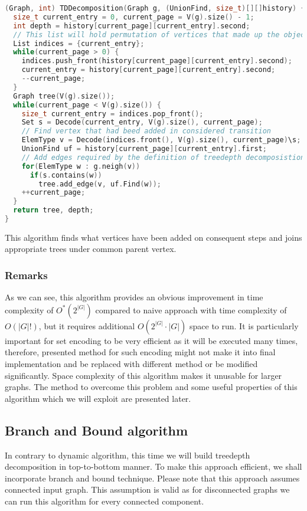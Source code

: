 \begin{lstlisting}[language=C++]
(Graph, int) TDDecomposition(Graph g, (UnionFind, size_t)[][]history) {
  size_t current_entry = 0, current_page = V(g).size() - 1;
  int depth = history[current_page][current_entry].second;
  // This list will hold permutation of vertices that made up the object in history[current_page][current_entry]
  List indices = {current_entry};
  while(current_page > 0) {
    indices.push_front(history[current_page][current_entry].second);
    current_entry = history[current_page][current_entry].second;
    --current_page;
  }
  Graph tree(V(g).size());
  while(current_page < V(g).size()) {
    size_t current_entry = indices.pop_front();
    Set s = Decode(current_entry, V(g).size(), current_page);
    // Find vertex that had beed added in considered transition
    ElemType v = Decode(indices.front(), V(g).size(), current_page)\s;
    UnionFind uf = history[current_page][current_entry].first;
    // Add edges required by the definition of treedepth decomposistion
    for(ElemType w : g.neigh(v))
      if(s.contains(w))
        tree.add_edge(v, uf.Find(w));
    ++current_page;
  }
  return tree, depth;
}
\end{lstlisting}
This algorithm finds what vertices have been added on consequent steps and joins appropriate trees under common parent vertex.
\subsubsection{Remarks}
As we can see, this algorithm provides an obvious improvement in time complexity of $O^{*}\left(2^{\left|G\right|}\right)$ compared to naive approach with time complexity of $O\left(\left|G\right|!\right)$, but it requires additional $O\left(2^{\left|G\right|}\cdot\left|G\right|\right)$ space to run. It is particularly important for set encoding to be very efficient as it will be executed many times, therefore, presented method for such encoding might not make it into final implementation and be replaced with different method or be modified significantly. Space complexity of this algorithm makes it unusable for larger graphs. The method to overcome this problem and some useful properties of this algorithm which we will exploit are presented later.
\clearpage
\subsection{Branch and Bound algorithm}
In contrary to dynamic algorithm, this time we will build treedepth decomposition in top-to-bottom manner. To make this approach efficient, we shall incorporate branch and bound technique. Please note that this approach assumes connected input graph. This assumption is valid as for disconnected graphs we can run this algorithm for every connected component.
